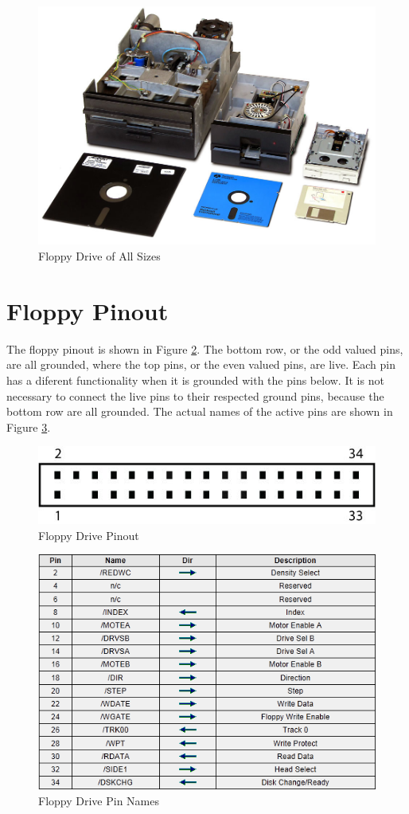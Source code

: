 \documentclass[11pt, a4paper]{report}
\begin{document}
\begin{figure}[H]
\hspace*{-2cm}    
    \centering
    \includegraphics[width=.5\textwidth]{floppydrive_sizes.jpg}
    \caption{Floppy Drive of All Sizes}
    \label{fig:sizes}
\end{figure}


\section{Floppy Pinout}

The floppy pinout is shown in Figure \ref{fig:pinOut}. The bottom row, or the odd valued pins, are all grounded, where the top pins, or the even valued pins, are live. Each pin has a diferent functionality when it is grounded with the pins below. It is not necessary to connect the live pins to their respected ground pins, because the bottom row are all grounded. The actual names of the active pins are shown in Figure \ref{fig:pinNames}.

\begin{figure}[H]
\hspace*{-2cm}    
    \centering
    \includegraphics[width=.75\textwidth]{floppy_pinout.jpg}
    \caption{Floppy Drive Pinout}
    \label{fig:pinOut}
\end{figure}

\begin{figure}[H]
\hspace*{-2cm}    
    \centering
    \includegraphics[width=.75\textwidth]{pinNames.png}
    \caption{Floppy Drive Pin Names}
    \label{fig:pinNames}
\end{figure}
\end{document}
